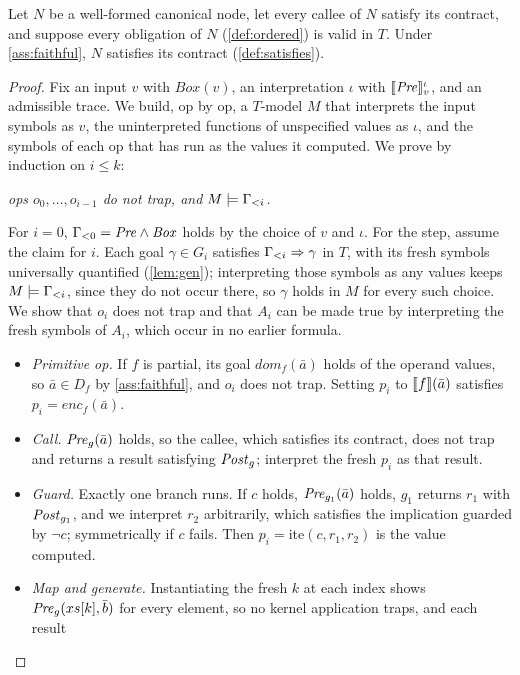 \begin{theorem}\label{thm:soundness}
Let $N$ be a well-formed canonical node, let every callee of $N$ satisfy its contract, and
suppose every obligation of $N$ (\cref{def:ordered}) is valid in $T$. Under
\cref{ass:faithful}, $N$ satisfies its contract (\cref{def:satisfies}).
\end{theorem}
\begin{proof}
Fix an input $v$ with $\mathit{Box}(v)$, an interpretation $\iota$ with $\llbracket \mathit{Pre} \rrbracket^\iota_v$,
and an admissible trace. We build, op by op, a $T$-model $M$ that interprets the input symbols
as $v$, the uninterpreted functions of unspecified values as $\iota$, and the symbols of each op
that has run as the values it computed. We prove by induction on $i\le k$:
\begin{center}
\emph{ops $o_0,\dots,o_{i-1}$ do not trap, and $M\models\Gamma_{<i}$.}
\end{center}
For $i=0$, $\Gamma_{<0}=\mathit{Pre}\wedge\mathit{Box}$ holds by the choice of $v$ and $\iota$. For the
step, assume the claim for $i$. Each goal $\gamma\in G_i$ satisfies $\Gamma_{<i}\Rightarrow\gamma$
in $T$, with its fresh symbols universally quantified (\cref{lem:gen}); interpreting those
symbols as any values keeps $M\models\Gamma_{<i}$, since they do not occur there, so $\gamma$
holds in $M$ for every such choice. We show that $o_i$ does not trap and that $A_i$ can be made
true by interpreting the fresh symbols of $A_i$, which occur in no earlier formula.
\begin{itemize}
\item \emph{Primitive op.} If $f$ is partial, its goal $\mathit{dom}_f(\bar a)$ holds of the
  operand values, so $\bar a\in D_f$ by \cref{ass:faithful}, and $o_i$ does not trap. Setting
  $p_i$ to $\llbracket f \rrbracket(\bar a)$ satisfies $p_i=\mathit{enc}_f(\bar a)$.
\item \emph{Call.} $\mathit{Pre}_g(\bar a)$ holds, so the callee, which satisfies its contract, does not
  trap and returns a result satisfying $\mathit{Post}_g$; interpret the fresh $p_i$ as that result.
\item \emph{Guard.} Exactly one branch runs. If $c$ holds, $\mathit{Pre}_{g_1}(\bar a)$ holds, $g_1$
  returns $r_1$ with $\mathit{Post}_{g_1}$, and we interpret $r_2$ arbitrarily, which satisfies the
  implication guarded by $\neg c$; symmetrically if $c$ fails. Then $p_i=\mathrm{ite}(c,r_1,r_2)$
  is the value computed.
\item \emph{Map and generate.} Instantiating the fresh $k$ at each index shows
  $\mathit{Pre}_g(xs[k],\bar b)$ for every element, so no kernel application traps, and each result

\end{itemize}
\end{proof}
